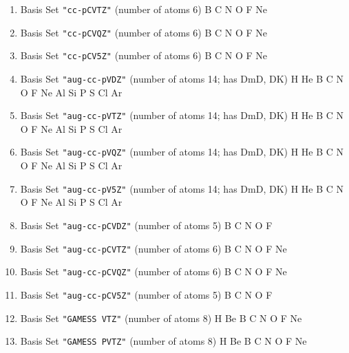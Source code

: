 \begin{enumerate}
\item Basis Set \verb#"cc-pCVTZ"# (number of atoms 6)  \newline 
  B C N O F Ne


\item Basis Set \verb#"cc-pCVQZ"# (number of atoms 6)  \newline 
  B C N O F Ne


\item Basis Set \verb#"cc-pCV5Z"# (number of atoms 6)  \newline 
  B C N O F Ne


\item Basis Set \verb#"aug-cc-pVDZ"# (number of atoms 14; has DmD, DK)  \newline 
  H He B C N O F Ne Al Si P S Cl Ar


\item Basis Set \verb#"aug-cc-pVTZ"# (number of atoms 14; has DmD, DK)  \newline 
  H He B C N O F Ne Al Si P S Cl Ar


\item Basis Set \verb#"aug-cc-pVQZ"# (number of atoms 14; has DmD, DK)  \newline 
  H He B C N O F Ne Al Si P S Cl Ar


\item Basis Set \verb#"aug-cc-pV5Z"# (number of atoms 14; has DmD, DK)  \newline 
  H He B C N O F Ne Al Si P S Cl Ar


\item Basis Set \verb#"aug-cc-pCVDZ"# (number of atoms 5)  \newline 
  B C N O F


\item Basis Set \verb#"aug-cc-pCVTZ"# (number of atoms 6)  \newline 
  B C N O F Ne


\item Basis Set \verb#"aug-cc-pCVQZ"# (number of atoms 6)  \newline 
  B C N O F Ne


\item Basis Set \verb#"aug-cc-pCV5Z"# (number of atoms 5)  \newline 
  B C N O F


\item Basis Set \verb#"GAMESS VTZ"# (number of atoms 8)  \newline 
  H Be B C N O F Ne


\item Basis Set \verb#"GAMESS PVTZ"# (number of atoms 8)  \newline 
  H Be B C N O F Ne



\end{enumerate}
